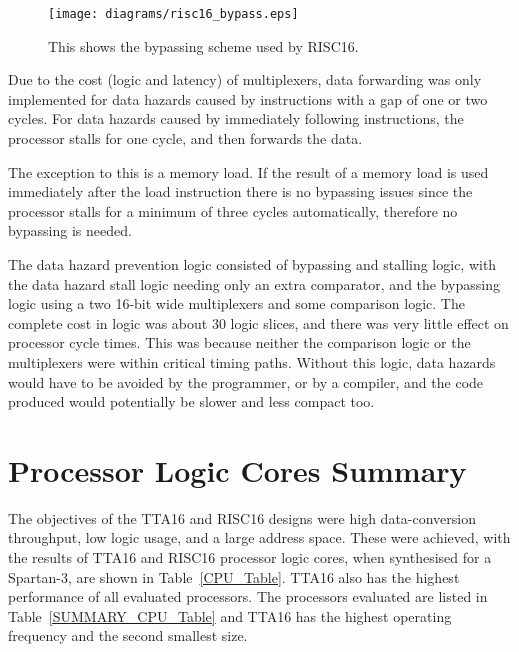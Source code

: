 \begin{figure}[h!]
\begin{center}
\texttt{[image: diagrams/risc16\_bypass.eps]}
\caption[Data Bypassing Scheme Used by RISC16]{This shows the bypassing scheme
used by RISC16.}
\label{RISC16_Bypass}
\end{center}
\end{figure}

Due to the cost (logic and latency) of multiplexers, data forwarding was only
implemented for data hazards caused by instructions with a gap of one or two
cycles. For data hazards caused by immediately following instructions, the
processor stalls for one cycle, and then forwards the data.

The exception to this is a memory load. If the result of a memory load is used
immediately after the load instruction there is no bypassing issues since the
processor stalls for a minimum of three cycles automatically, therefore no
bypassing is needed.

The data hazard prevention logic consisted of bypassing and stalling logic, with
the data hazard stall logic needing only an extra comparator, and the bypassing
logic using a two 16-bit wide multiplexers and some comparison logic. The
complete cost in logic was about 30 logic slices, and there was very little
effect on processor cycle times. This was because neither the comparison logic or
the multiplexers were within critical timing paths. Without this logic, data
hazards would have to be avoided by the programmer, or by a compiler, and the
code produced would potentially be slower and less compact too.


\section{Processor Logic Cores Summary}
\label{CPU_Summary}

The objectives of the TTA16 and RISC16 designs were high data-conversion
throughput, low logic usage, and a large address space. These were achieved, with
the results of TTA16 and RISC16 processor logic cores, when synthesised for a
Spartan-3, are shown in Table~\ref{CPU_Table}. TTA16 also has the highest
performance of all evaluated processors. The processors evaluated are listed in
Table~\ref{SUMMARY_CPU_Table} and TTA16 has the highest operating frequency and
the second smallest size.

